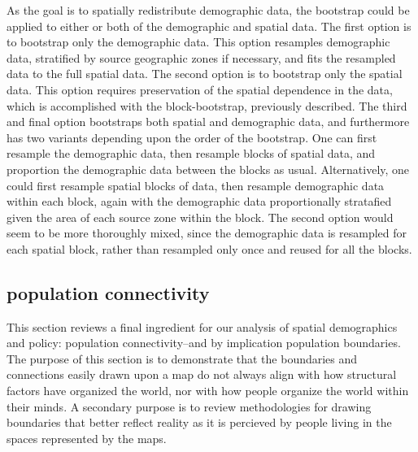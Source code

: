 \documentclass[draft]{article}
\begin{document}
As the goal is to spatially redistribute demographic data, the bootstrap could be applied to either or both of the demographic and spatial data.  The first option is to bootstrap only the demographic data.  This option resamples demographic data, stratified by source geographic zones if necessary, and fits the resampled data to the full spatial data.  The second option is to bootstrap only the spatial data.  This option requires preservation of the spatial dependence in the data, which is accomplished with the block-bootstrap, previously described.  The third and final option bootstraps both spatial and demographic data, and furthermore has two variants depending upon the order of the bootstrap.  One can first resample the demographic data, then resample blocks of spatial data, and proportion the demographic data between the blocks as usual.  Alternatively, one could first resample spatial blocks of data, then resample demographic data within each block, again with the demographic data proportionally stratafied given the area of each source zone within the block.  The second option would seem to be more thoroughly mixed, since the demographic data is resampled for each spatial block, rather than resampled only once and reused for all the blocks.



\subsection{population connectivity}

This section reviews a final ingredient for our analysis of spatial demographics and policy: population connectivity--and by implication population boundaries.  The purpose of this section is to demonstrate that the boundaries and connections easily drawn upon a map do not always align with how structural factors have organized the world, nor with how people organize the world within their minds.  A secondary purpose is to review methodologies for drawing boundaries that better reflect reality as it is percieved by people living in the spaces represented by the maps. %
\end{document}
